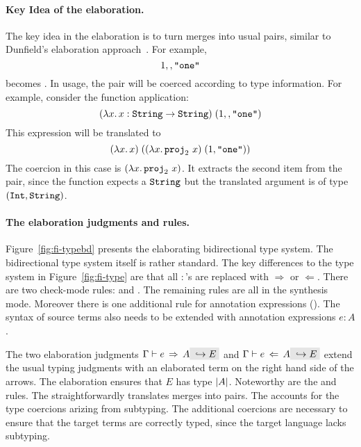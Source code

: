 \paragraph{Key Idea of the elaboration.}
The key idea in the elaboration is to turn merges into usual pairs, similar to Dunfield's
elaboration approach~\cite{dunfield2014elaborating}.
For example, \[ 1 \mergeop \code{"one"} \] becomes 
{}. In usage, the pair will be coerced according to type
information. For example, consider the function application: 
\[ \app {(\lamty x {\code{String}} x : \code{String} \to \code{String})} {(1 \mergeop \code{"one"})} \] 
This expression will be translated to \[ \app
{(\lamty x {\code{String}} x)} {(\app {(\lamty x {\pair {\code{Int}} {\code{String}}} {\proj 2~x})}
{\pair 1 {\code{"one"}}})} \] The coercion in this case is $(\lamty x {\pair
{\code{Int}} {\code{String}}} {\proj 2~x})$. It extracts the second item from the pair, since
the function expects a $\code{String}$ but the translated argument is of type $\pair
{\code{Int}} {\code{String}}$.

\paragraph{The elaboration judgments and rules.}
Figure~\ref{fig:fi-typebd} presents the elaborating bidirectional type
system. The bidirectional type system itself is rather standard.  The
key differences to the type system in Figure~\ref{fig:fi-type} are
that all $:$'s are replaced with $\Rightarrow$ or $\Leftarrow$. There
are two check-mode rules:  and
. The remaining rules are all in the synthesis
mode. Moreover there is one additional rule for annotation expressions
(). The syntax of source terms also needs to be
extended with annotation expressions $e : A$. 

The two elaboration judgments $\jinfer \Gamma e A \yields E$ and
$\jcheck \Gamma e A \yields E$ extend the usual typing judgments with
an elaborated term on the right hand side of the arrows. The
elaboration ensures that $E$ has type $\im A$. 
Noteworthy are the  
and  rules. The 
straightforwardly translates merges into pairs. The
 accounts for the type coercions arizing 
from subtyping. The additional coercions are necessary to ensure that
the target terms are correctly typed, since the target language lacks
subtyping.


